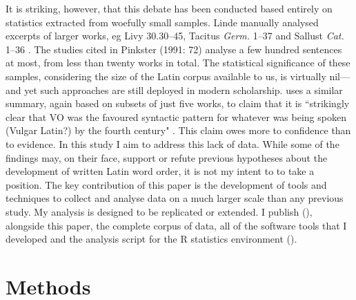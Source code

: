 \documentclass[11pt,a4paper]{scrartcl} %
\begin{document}
It is striking, however, that this debate has been conducted based entirely on statistics extracted from woefully small samples. Linde manually analysed excerpts of larger works, eg Livy 30.30--45, Tacitus \textit{Germ.} 1--37 and Sallust \textit{Cat.} 1--36 \cite[154]{linde}. The studies cited in Pinkster (1991: 72) analyse a few hundred sentences at most, from less than twenty works in total. The statistical significance of these samples, considering the size of the Latin corpus available to us, is virtually nil---and yet such approaches are still deployed in modern scholarship. \cite{blake} uses a similar summary, again based on subsets of just five works, to claim that it is ``strikingly clear that VO was the favoured syntactic pattern for whatever was being spoken (Vulgar Latin?) by the fourth century" \cite[223]{blake}. This claim owes more to confidence than to evidence. In this study I aim to address this lack of data. While some of the findings may, on their face, support or refute previous hypotheses about the development of written Latin word order, it is not my intent to to take a position. The key contribution of this paper is the development of tools and techniques to collect and analyse data on a much larger scale than any previous study. My analysis is designed to be replicated or extended. I publish (\cite{ovvo}), alongside this paper, the complete corpus of data, all of the software tools that I developed and the analysis script for the R statistics environment (\cite{r}).

\section{Methods}
\end{document}
